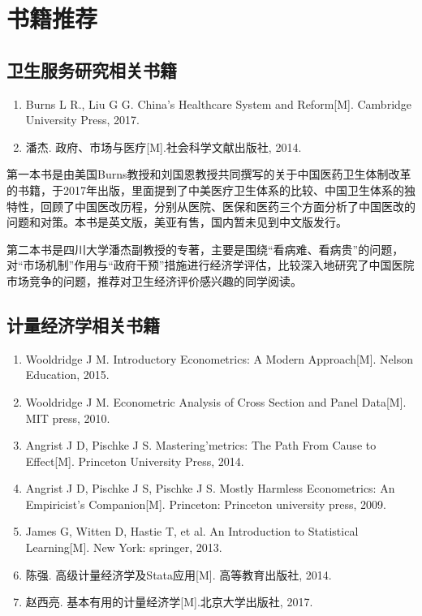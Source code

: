 \documentclass[11pt, a4paper]{article}
\begin{document}
\section{书籍推荐}

\subsection{卫生服务研究相关书籍}
\begin{enumerate}[(1)]
	\item Burns L R., Liu G G. China's Healthcare System and Reform[M]. Cambridge University Press, 2017.
	\item 潘杰. 政府、市场与医疗[M].社会科学文献出版社, 2014.	
\end{enumerate}

第一本书是由美国Burns教授和刘国恩教授共同撰写的关于中国医药卫生体制改革的书籍，于2017年出版，里面提到了中美医疗卫生体系的比较、中国卫生体系的独特性，回顾了中国医改历程，分别从医院、医保和医药三个方面分析了中国医改的问题和对策。本书是英文版，美亚有售，国内暂未见到中文版发行。

第二本书是四川大学潘杰副教授的专著，主要是围绕“看病难、看病贵”的问题，对“市场机制”作用与“政府干预”措施进行经济学评估，比较深入地研究了中国医院市场竞争的问题，推荐对卫生经济评价感兴趣的同学阅读。

\subsection{计量经济学相关书籍}
\begin{enumerate}[(1)]
	\item Wooldridge J M. Introductory Econometrics: A Modern Approach[M]. Nelson Education, 2015.
	\item Wooldridge J M. Econometric Analysis of Cross Section and Panel Data[M]. MIT press, 2010.
	\item Angrist J D, Pischke J S. Mastering'metrics: The Path From Cause to Effect[M]. Princeton University Press, 2014.
	\item Angrist J D, Pischke J S, Pischke J S. Mostly Harmless Econometrics: An Empiricist's Companion[M]. Princeton: Princeton university press, 2009.
	\item James G, Witten D, Hastie T, et al. An Introduction to Statistical Learning[M]. New York: springer, 2013.
	\item 陈强. 高级计量经济学及Stata应用[M]. 高等教育出版社, 2014.
	\item 赵西亮. 基本有用的计量经济学[M].北京大学出版社, 2017.

\end{enumerate}
\end{document}
